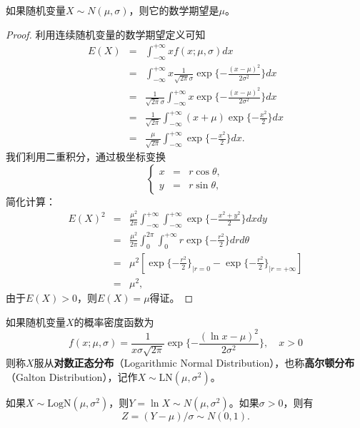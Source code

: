 \begin{theorem}
如果随机变量$X\sim N(\mu,\sigma)$，则它的数学期望是$\mu$。
\end{theorem}
\begin{proof}
利用连续随机变量的数学期望定义可知
\[
\begin{array}{lcl}
    E(X) &=& \int_{-\infty}^{+\infty}x  f(x;\mu,\sigma) dx\\
    &=& \int_{-\infty}^{+\infty}x  \frac{1}{\sqrt{2\pi}\sigma} \exp\{-\frac{(x-\mu)^2}{2\sigma^2}\} dx\\
    &=& \frac{1}{\sqrt{2\pi}\sigma} \int_{-\infty}^{+\infty} x \exp\{-\frac{(x-\mu)^2}{2\sigma^2}\} dx\\
    &=& \frac{1}{\sqrt{2\pi}} \int_{-\infty}^{+\infty} (x + \mu)\exp\{-\frac{x^2}{2}\} dx\\
    &=& \frac{\mu}{\sqrt{2\pi}} \int_{-\infty}^{+\infty} \exp\{-\frac{x^2}{2}\} dx.
\end{array}
\]
我们利用二重积分，通过极坐标变换
\[
\left\{
    \begin{array}{lcl}
        x &=& r\cos\theta,\\
        y &=& r\sin\theta,
    \end{array}
\right.
\]
简化计算：
\[
\begin{array}{lcl}
    E(X)^2 &=& \frac{\mu^2}{2\pi} \int_{-\infty}^{+\infty} \int_{-\infty}^{+\infty} \exp\{-\frac{x^2 + y^2}{2}\} dx dy\\
    &=& \frac{\mu^2}{2\pi} \int_0^{2\pi} \int_0^{+\infty} r \exp\{-\frac{r^2}{2}\} dr d\theta\\
    &=& \mu^2 [\exp\{-\frac{r^2}{2}\}_{|r=0} - \exp\{-\frac{r^2}{2}\}_{|r=+\infty}]\\
    &=& \mu^2,
\end{array}
\]
由于$E(X)>0$，则$E(X)=\mu$得证。
\end{proof}

\begin{definition}[对数正态分布]
如果随机变量$X$的概率密度函数为
\begin{equation}
    f(x;\mu,\sigma) = \frac{1}{x\sigma\sqrt{2\pi}} \exp\{-\frac{(\ln x-\mu)^2}{2\sigma^2}\},\quad x > 0
\end{equation}
则称$X$服从\textbf{对数正态分布}（Logarithmic Normal Distribution），也称\textbf{高尔顿分布}（Galton Distribution），记作$X\sim \mathrm{LN}(\mu,\sigma^2)$。
\end{definition}

\begin{theorem}
如果$X\sim \mathrm{LogN}(\mu, \sigma^2)$，则$Y=\ln X\sim N(\mu, \sigma^2)$。如果$\sigma>0$，则有\[Z=(Y-\mu)/\sigma\sim N(0,1).\]
\end{theorem}

